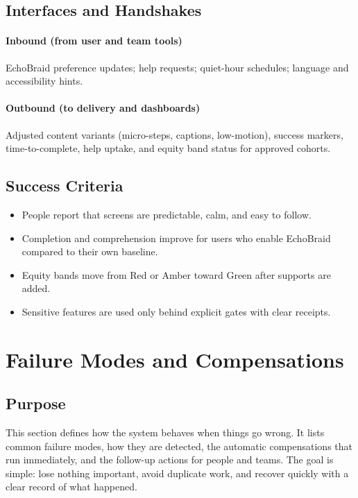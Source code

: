 \documentclass[12pt]{article}
\begin{document}
\subsection*{Interfaces and Handshakes}
\paragraph{Inbound (from user and team tools)}
EchoBraid preference updates; help requests; quiet-hour schedules; language and accessibility hints.

\paragraph{Outbound (to delivery and dashboards)}
Adjusted content variants (micro-steps, captions, low-motion), success markers, time-to-complete, help uptake, and equity band status for approved cohorts.

\subsection*{Success Criteria}
\begin{itemize}[leftmargin=*]
  \item People report that screens are predictable, calm, and easy to follow.
  \item Completion and comprehension improve for users who enable EchoBraid compared to their own baseline.
  \item Equity bands move from Red or Amber toward Green after supports are added.
  \item Sensitive features are used only behind explicit gates with clear receipts.
\end{itemize}

\section{Failure Modes and Compensations}

\subsection*{Purpose}
This section defines how the system behaves when things go wrong. It lists common failure modes, how they are detected, the automatic compensations that run immediately, and the follow-up actions for people and teams. The goal is simple: lose nothing important, avoid duplicate work, and recover quickly with a clear record of what happened.
\end{document}
